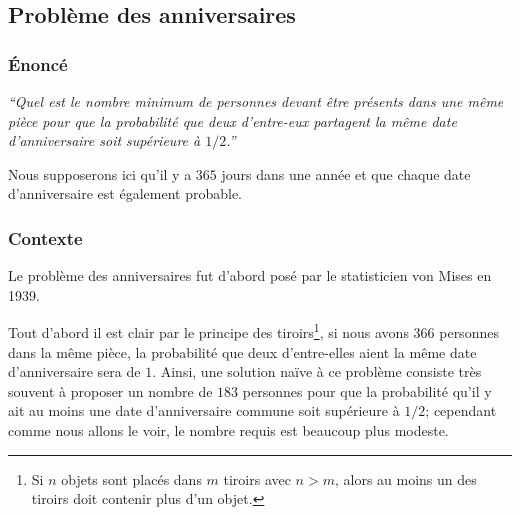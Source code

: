 \documentclass[11pt,a4paper]{article}
\begin{document}
\subsection{Problème des anniversaires}

\subsubsection{Énoncé}

\textit{``Quel est le nombre minimum de personnes devant être présents dans une même pièce pour que la probabilité que deux d'entre-eux partagent la même date d'anniversaire soit supérieure à $1/2$.''}

Nous supposerons ici qu'il y a $365$ jours dans une année et que chaque date d'anniversaire est également probable.

\subsubsection{Contexte}

Le problème des anniversaires fut d'abord posé par le statisticien von Mises en 1939.

Tout d'abord il est clair par le principe des tiroirs\footnote{Si $n$ objets sont placés dans $m$ tiroirs avec $n > m$, alors au moins un des tiroirs doit contenir plus d'un objet.}, si nous avons $366$ personnes dans la même pièce, la probabilité que deux d'entre-elles aient la même date d'anniversaire sera de $1$. Ainsi, une solution naïve à ce problème consiste très souvent à proposer un nombre de $183$ personnes pour que la probabilité qu'il y ait au moins une date d'anniversaire commune soit supérieure à $1/2$; cependant comme nous allons le voir, le nombre requis est beaucoup plus modeste.
\end{document}
